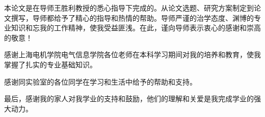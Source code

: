 \begin{acknowledgements}
	本论文是在导师王胜利教授的悉心指导下完成的。从论文选题、研究方案制定到论文撰写，导师都给予了精心的指导和热情的帮助。导师严谨的治学态度、渊博的专业知识和忘我的工作精神，使我受益匪浅。在此，谨向导师表示衷心的感谢和崇高的敬意！

	感谢上海电机学院电气信息学院各位老师在本科学习期间对我的培养和教育，使我掌握了扎实的专业基础知识。

	感谢同实验室的各位同学在学习和生活中给予的帮助和支持。

	最后，感谢我的家人对我学业的支持和鼓励，他们的理解和关爱是我完成学业的强大动力。
\end{acknowledgements}
